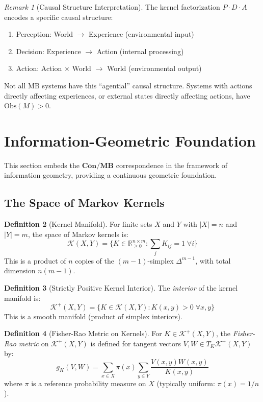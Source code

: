 \documentclass[11pt,a4paper]{article}
\theoremstyle{definition}
\newtheorem{definition}{Definition}[section]
\theoremstyle{plain}
\theoremstyle{remark}
\newtheorem{remark}[definition]{Remark}
\newcommand{\Con}{\mathbf{Con}}
\newcommand{\MB}{\mathbf{MB}}
\begin{document}
\begin{remark}[Causal Structure Interpretation]
The kernel factorization $P \cdot D \cdot A$ encodes a specific causal structure:
\begin{enumerate}
    \item Perception: World $\to$ Experience (environmental input)
    \item Decision: Experience $\to$ Action (internal processing)
    \item Action: Action $\times$ World $\to$ World (environmental output)
\end{enumerate}
Not all MB systems have this ``agential'' causal structure. Systems with actions directly affecting experiences, or external states directly affecting actions, have $\text{Obs}(M) > 0$.
\end{remark}

\section{Information-Geometric Foundation}\label{sec:info-geom}

This section embeds the $\Con/\MB$ correspondence in the framework of information geometry, providing a continuous geometric foundation.

\subsection{The Space of Markov Kernels}

\begin{definition}[Kernel Manifold]
For finite sets $X$ and $Y$ with $|X| = n$ and $|Y| = m$, the space of Markov kernels is:
\[
\mathcal{K}(X, Y) = \{ K \in \mathbb{R}^{n \times m}_{\geq 0} : \sum_{j} K_{ij} = 1 \; \forall i \}
\]
This is a product of $n$ copies of the $(m-1)$-simplex $\Delta^{m-1}$, with total dimension $n(m-1)$.
\end{definition}

\begin{definition}[Strictly Positive Kernel Interior]
The \emph{interior} of the kernel manifold is:
\[
\mathcal{K}^+(X, Y) = \{ K \in \mathcal{K}(X, Y) : K(x, y) > 0 \; \forall x, y \}
\]
This is a smooth manifold (product of simplex interiors).
\end{definition}

\begin{definition}[Fisher-Rao Metric on Kernels]\label{def:fisher-rao}
For $K \in \mathcal{K}^+(X, Y)$, the \emph{Fisher-Rao metric} on $\mathcal{K}^+(X, Y)$ is defined for tangent vectors $V, W \in T_K \mathcal{K}^+(X, Y)$ by:
\[
g_K(V, W) = \sum_{x \in X} \pi(x) \sum_{y \in Y} \frac{V(x,y) W(x,y)}{K(x,y)}
\]
where $\pi$ is a reference probability measure on $X$ (typically uniform: $\pi(x) = 1/n$).
\end{definition}
\end{document}
